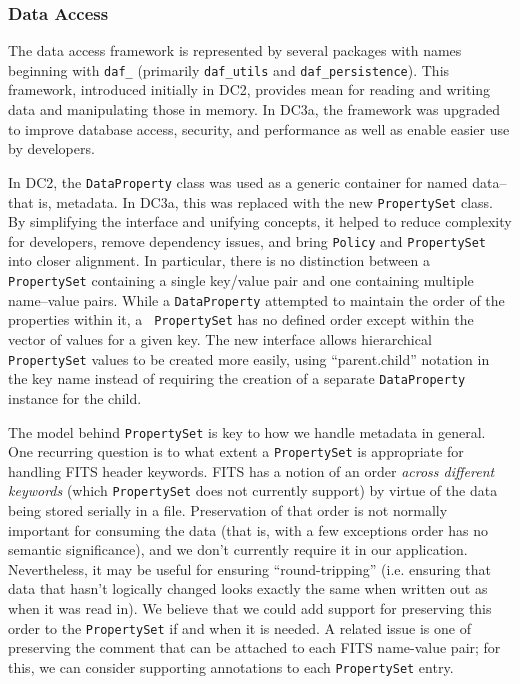 
\subsubsection{Data Access}

The data access framework is represented by several packages with
names beginning with \texttt{daf\_} (primarily \texttt{daf\_utils}
and \texttt{daf\_persistence}).  This framework, introduced initially
in DC2, provides mean for reading and writing data and manipulating
those in memory.  In DC3a, the framework was upgraded to improve
database access, security, and performance as well as enable easier
use by developers.  

In DC2, the {\tt DataProperty} class was used as a generic container
for named data--that is, metadata.  In DC3a, this was replaced with
the new {\tt PropertySet} class.  By simplifying the interface and
unifying concepts, it helped to reduce complexity for developers,
remove dependency issues, and bring {\tt Policy} and {\tt PropertySet}
into closer alignment.  In particular, there is no distinction between
a {\tt PropertySet} containing a single key/value pair and one
containing multiple name--value pairs.  While a {\tt DataProperty}
attempted to maintain the order of the properties within it, a {\tt
PropertySet} has no defined order except within the vector of values
for a given key.  The new interface allows hierarchical {\tt
PropertySet} values to be created more easily, using ``parent.child''
notation in the key name instead of requiring the creation of a
separate {\tt DataProperty} instance for the child.  

The model behind {\tt PropertySet} is key to how we handle metadata in
general.  One recurring question is to what extent a {\tt PropertySet}
is appropriate for handling FITS header keywords.  FITS has a notion
of an order {\it across different keywords} (which {\tt PropertySet} does not
currently support) by virtue of the data being stored serially in a
file.  Preservation of that order is not normally important for
consuming the data (that is, with a few exceptions order has no
semantic significance), and we don't currently require it in our
application.  Nevertheless, it may be useful for ensuring
``round-tripping'' (i.e. ensuring that data that hasn't logically
changed looks exactly the same when written out as when it was read
in).  We believe that we could add support for preserving this order
to the {\tt PropertySet} if and when it is needed.   A related issue
is one of preserving the comment that can be attached to each FITS
name-value pair; for this, we can consider supporting annotations to
each {\tt PropertySet} entry.  

